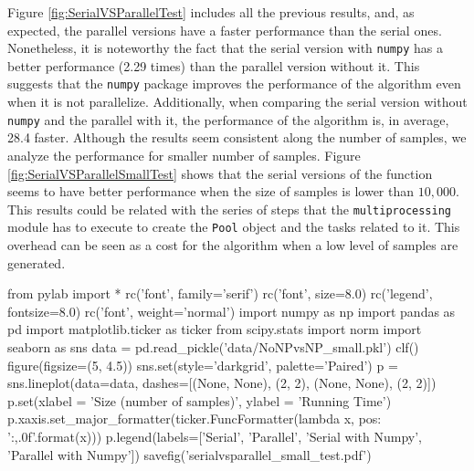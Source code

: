 \documentclass[11pt]{article}
\begin{document}
Figure \ref{fig:SerialVSParallelTest} includes all the previous results, and, as expected, the parallel versions have a
faster performance than the serial ones. Nonetheless, it is noteworthy the fact that the serial version with \texttt{numpy}
has a better performance (2.29 times) than the parallel version without it. This suggests that the \texttt{numpy} package
improves the performance of the algorithm even when it is not parallelize. Additionally, when comparing the serial version without
\texttt{numpy} and the parallel with it, the performance of the algorithm is, in average, 28.4 faster. Although the results
seem consistent along the number of samples, we analyze the performance for smaller number of samples. Figure \ref{fig:SerialVSParallelSmallTest}
shows that the serial versions of the function seems to have better performance when the size of samples is lower than
$10,000$. This results could be related with the series of steps that the \texttt{multiprocessing} module has to execute
to create the \texttt{Pool} object and the tasks related to it. This overhead can be seen as a cost for the algorithm when
a low level of samples are generated.

\begin{pycode}
from pylab import *
rc('font', family='serif')
rc('font', size=8.0)
rc('legend', fontsize=8.0)
rc('font', weight='normal')
import numpy as np
import pandas as pd
import matplotlib.ticker as ticker
from scipy.stats import norm
import seaborn as sns
data = pd.read_pickle('data/NoNPvsNP_small.pkl')
clf()
figure(figsize=(5, 4.5))
sns.set(style='darkgrid', palette='Paired')
p = sns.lineplot(data=data, dashes=[(None, None), (2, 2), (None, None), (2, 2)])
p.set(xlabel = 'Size (number of samples)', ylabel = 'Running Time')
p.xaxis.set_major_formatter(ticker.FuncFormatter(lambda x, pos: '{:,.0f}'.format(x)))
p.legend(labels=['Serial', 'Parallel', 'Serial with Numpy', 'Parallel with Numpy'])
savefig('serialvsparallel_small_test.pdf')
\end{pycode}
\end{document}
